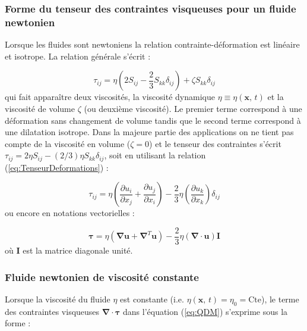 \subsubsection*{Forme du tenseur des contraintes visqueuses pour un fluide newtonien}

Lorsque les fluides sont newtoniens la relation contrainte-d\'eformation
est lin\'eaire et isotrope. La relation g\'en\'erale s'\'ecrit :

\begin{equation}
\tau_{ij}=\eta\left(2S_{ij}-\frac{2}{3}S_{kk}\delta_{ij}\right)+\zeta S_{kk}\delta_{ij}\label{eq:Contraintes-Newtonien}
\end{equation}
qui fait appara\^itre deux viscosit\'es, la viscosit\'e dynamique $\eta\equiv\eta(\mathbf{x},\,t)$
et la viscosit\'e de volume $\zeta$ (ou deuxi\`eme viscosit\'e). Le premier
terme correspond \`a une d\'eformation sans changement de volume tandis
que le second terme correspond \`a une dilatation isotrope. Dans la
majeure partie des applications on ne tient pas compte de la viscosit\'e
en volume ($\zeta=0$) et le tenseur des contraintes s'\'ecrit $\tau_{ij}=2\eta S_{ij}-(2/3)\eta S_{kk}\delta_{ij}$,
soit en utilisant la relation (\ref{eq:TenseurDeformations}) :

\begin{equation}
\tau_{ij}=\eta\left(\frac{\partial u_{i}}{\partial x_{j}}+\frac{\partial u_{j}}{\partial x_{i}}\right)-\frac{2}{3}\eta\left(\frac{\partial u_{k}}{\partial x_{k}}\right)\delta_{ij}\label{eq:Contraintes}
\end{equation}
ou encore en notations vectorielles :

\begin{equation}
\boldsymbol{\tau}=\eta(\boldsymbol{\nabla}\mathbf{u}+\boldsymbol{\nabla}^{T}\mathbf{u})-\frac{2}{3}\eta(\boldsymbol{\nabla}\cdot\mathbf{u})\mathbf{I}\label{eq:Contraintes-Deformations_Newtonien}
\end{equation}
o\`u $\mathbf{I}$ est la matrice diagonale unit\'e.


\subsubsection*{Fluide newtonien de viscosit\'e constante}

Lorsque la viscosit\'e du fluide $\eta$ est constante (i.e. $\eta(\mathbf{x},\,t)=\eta_{0}=\mbox{Cte}$),
le terme des contraintes visqueuses $\boldsymbol{\nabla}\cdot\boldsymbol{\tau}$
dans l'\'equation (\ref{eq:QDM}) s'exprime sous la forme :

